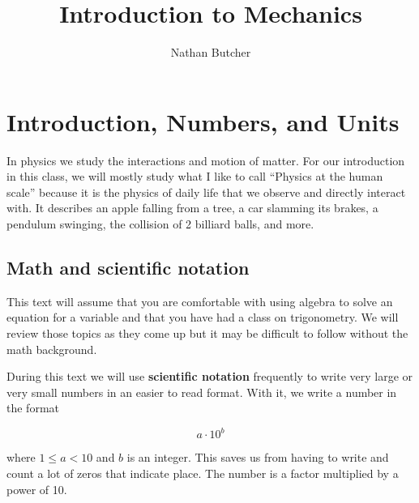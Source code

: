 \documentclass[12pt]{book}
\title{Introduction to Mechanics}
\author{Nathan Butcher}
\begin{document}
\graphicspath{{Figures/Units}}
\setcounter{chp}{0}

\newcommand{\scinot}[2]{#1 \cdot 10^{#2}}

\newcommand{\example}{\textbf{Example \texttt{\thechp}.\texttt{\theexample}}
\addtocounter{example}{1}

\hspace{10pt}}

\newcommand{\linespace}{\hspace{10pt}

\hrule

\hspace{10pt}}

\chapter{Introduction, Numbers, and Units}

\setcounter{example}{1}
\addtocounter{chp}{1}

In physics we study the interactions and motion of matter. For our introduction in this class, we will mostly study what I like to call ``Physics at the human scale'' because it is the physics of daily life that we observe and directly interact with. It describes an apple falling from a tree, a car slamming its brakes, a pendulum swinging, the collision of 2 billiard balls, and more.

\section{Math and scientific notation}

This text will assume that you are comfortable with using algebra to solve an equation for a variable and that you have had a class on trigonometry. We will review those topics as they come up but it may be difficult to follow without the math background.

During this text we will use \textbf{scientific notation} frequently to write very large or very small numbers in an easier to read format. With it, we write a number in the format

\begin{equation}
\scinot{a}{b}
\end{equation}

where $1 \leq a < 10$ and $b$ is an integer. This saves us from having to write and count a lot of zeros that indicate place. The number is a factor multiplied by a power of 10.
\end{document}
